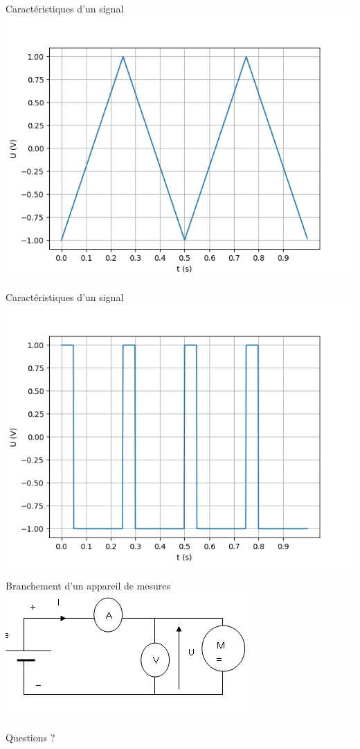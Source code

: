 \documentclass{beamer}
\begin{document}
    \begin{frame}{Caractéristiques d'un signal}
        \includegraphics[width=.8\textwidth]{Cours/Premieres/ETT/Seq03_alimenter/S03C01_chaine_energie_alimenter/images/triangle.png}
    \end{frame}
    
    \begin{frame}{Caractéristiques d'un signal}
        \includegraphics[width=.8\textwidth]{Cours/Premieres/ETT/Seq03_alimenter/S03C01_chaine_energie_alimenter/images/carre.png}
    \end{frame}
    
    \begin{frame}{Branchement d'un appareil de mesures}
        \includegraphics[width=.8\textwidth]{Cours/Premieres/ETT/Seq03_alimenter/S03C01_chaine_energie_alimenter/images/branchement.png}
    \end{frame}
    
    \begin{frame}[focus]
        Questions ? 
    \end{frame}
    
    \appendix
\end{document}
